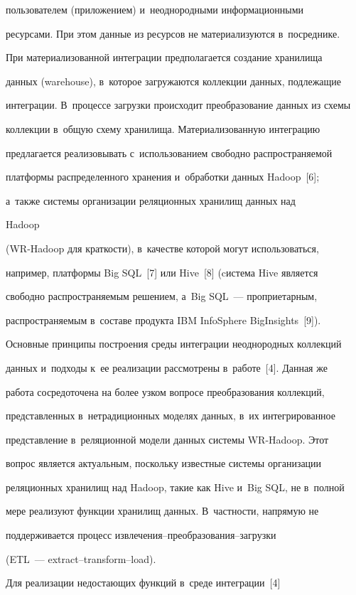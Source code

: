 пользователем (приложением) и~неоднородными информационными

ресурсами. При этом данные из ресурсов не материализуются в~посреднике.

При материализованной интеграции предполагается создание хранилища

данных (warehouse), в~которое загружаются коллекции данных, подлежащие

интеграции. В~процессе загрузки происходит преобразование данных из схемы

коллекции в~общую схему хранилища. Материализованную интеграцию

предлагается реализовывать с~использованием свободно распространяемой

платформы распределенного хранения и~обработки данных Hadoop~[6];

    а~так\-же системы организации реляционных хранилищ данных над

Hadoop

    (WR-Hadoop для краткости), в~качестве которой могут использоваться,

например, платформы Big SQL~[7] или Hive~[8] (cистема Hive является

свободно распространяемым решением, а~Big SQL~--- про\-при\-етар\-ным,

распространяемым в~со\-ста\-ве продукта IBM InfoSphere BigInsights~[9]).

Основные принципы построения среды интеграции неоднородных коллекций

данных и~подходы к~ее реализации рассмотрены в~работе~[4]. Данная же

работа сосредоточена на более узком вопросе преобразования коллекций,

представленных в~нетрадиционных моделях данных, в~их интегрированное

представление в~реляционной модели данных системы WR-Hadoop. Этот

вопрос является актуальным, поскольку известные системы организации

реляционных хранилищ над Hadoop, такие как Hive и~Big SQL, не в~полной

мере реализуют функции хранилищ данных. В~частности, напрямую не

поддерживается процесс из\-вле\-че\-ния--пре\-об\-ра\-зо\-ва\-ния--за\-груз\-ки

(ETL~--- extract--transform--load).

Для реализации недостающих функций в~среде интеграции~[4]


